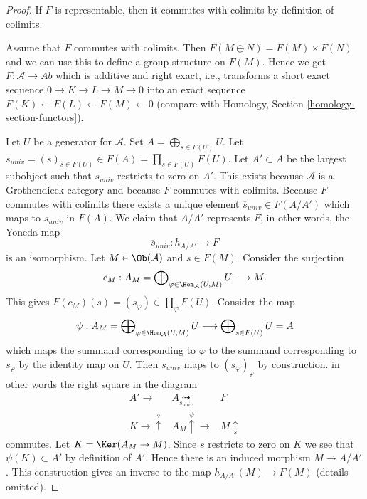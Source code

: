 \begin{proof}
If $F$ is representable, then it commutes with colimits by definition
of colimits.

\medskip\noindent
Assume that $F$ commutes with colimits. Then $F(M \oplus N) = F(M) \times F(N)$
and we can use this to define a group structure on $F(M)$. Hence we get
$F : \mathcal{A} \to \textit{Ab}$ which is additive and right exact, i.e.,
transforms a short exact sequence $0 \to K \to L \to M \to 0$ into an exact
sequence $F(K) \leftarrow F(L) \leftarrow F(M) \leftarrow 0$ (compare with
Homology, Section \ref{homology-section-functors}).

\medskip\noindent
Let $U$ be a generator for $\mathcal{A}$. Set $A = \bigoplus_{s \in F(U)} U$.
Let $s_{univ} = (s)_{s \in F(U)} \in F(A) = \prod_{s \in F(U)} F(U)$. Let
$A' \subset A$ be the largest subobject such that $s_{univ}$ restricts to
zero on $A'$. This exists because $\mathcal{A}$ is a Grothendieck category
and because $F$ commutes with colimits. Because $F$ commutes with colimits
there exists a unique element $\overline{s}_{univ} \in F(A/A')$ which
maps to $s_{univ}$ in $F(A)$. We claim that $A/A'$ represents $F$, in
other words, the Yoneda map
$$
\overline{s}_{univ} : h_{A/A'} \longrightarrow F
$$
is an isomorphism. Let $M \in \Ob(\mathcal{A})$ and $s \in F(M)$. Consider
the surjection
$$
c_M :
A_M = \bigoplus\nolimits_{\varphi \in \Hom_\mathcal{A}(U, M)} U
\longrightarrow
M.
$$
This gives $F(c_M)(s) = (s_\varphi) \in \prod_\varphi F(U)$.
Consider the map
$$
\psi :
A_M = \bigoplus\nolimits_{\varphi \in \Hom_\mathcal{A}(U, M)} U
\longrightarrow
\bigoplus\nolimits_{s \in F(U)} U = A
$$
which maps the summand corresponding to $\varphi$ to the summand
corresponding to $s_\varphi$ by the identity map on $U$. Then $s_{univ}$
maps to $(s_\varphi)_\varphi$ by construction.
in other words the right square in the diagram
$$
\begin{array}{ccc}A' \longrightarrow & A \underset{s_{univ}}{\dashrightarrow} & F \\ K \longrightarrow\overset{?}{\uparrow} & A_M \overset{\psi}{\uparrow}\longrightarrow & M \underset{s}{\uparrow}\end{array}
$$
commutes. Let $K = \Ker(A_M \to M)$. Since $s$ restricts to zero
on $K$ we see that $\psi(K) \subset A'$ by definition of $A'$. Hence there
is an induced morphism $M \to A/A'$. This construction gives an inverse
to the map $h_{A/A'}(M) \to F(M)$ (details omitted).
\end{proof}

